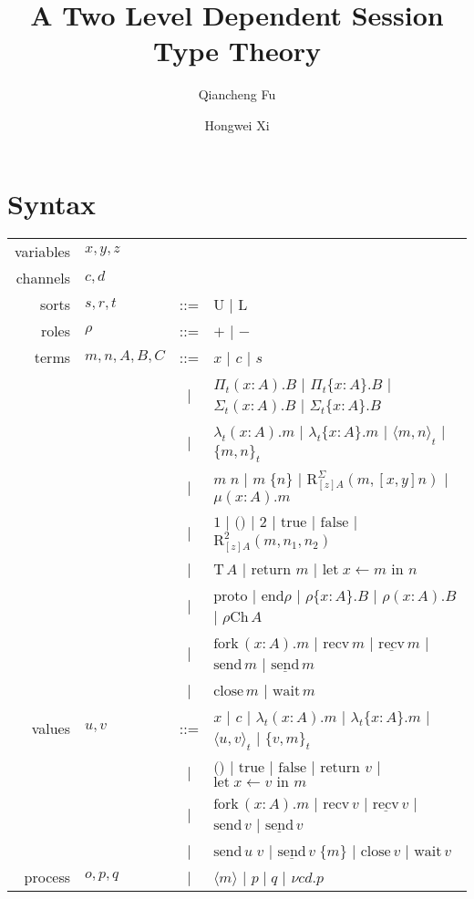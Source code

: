 \documentclass{article}
\title{A Two Level Dependent Session Type Theory}
\author[1]{Qiancheng Fu}
\author[1]{Hongwei Xi}
\affil[1]{Boston University}
\newcommand{\Un}{\text{U}}
\newcommand{\Ln}{\text{L}}
\newcommand{\PiR}[3]{\Pi_{#1}({#2}).{#3}}
\newcommand{\PiI}[3]{\Pi_{#1}\{{#2}\}.{#3}}
\newcommand{\lamR}[3]{\lambda_{#1}({#2}).{#3}}
\newcommand{\lamI}[3]{\lambda_{#1}\{{#2}\}.{#3}}
\newcommand{\appR}[2]{{#1}\;{#2}}
\newcommand{\appI}[2]{{#1}\;\{{#2}\}}
\newcommand{\SigR}[3]{\Sigma_{#1}({#2}).{#3}}
\newcommand{\SigI}[3]{\Sigma_{#1}\{{#2}\}.{#3}}
\newcommand{\pairR}[3]{\langle{{#1},{#2}}\rangle_{#3}}
\newcommand{\pairI}[3]{\{{#1},{#2}\}_{#3}}
\newcommand{\SigElim}[3]{\text{R}_{#1}^{\Sigma}({#2},{#3})}
\newcommand{\fix}[2]{\mu({#1}).{#2}}
\newcommand{\unit}{\text{1}}
\newcommand{\ii}{\text{()}}
\newcommand{\bool}{\text{2}}
\newcommand{\btrue}{\text{true}}
\newcommand{\bfalse}{\text{false}}
\newcommand{\boolElim}[4]{\text{R}_{#1}^{\bool}({#2},{#3},{#4})}
\newcommand{\T}[1]{\text{T}\,{#1}}
\newcommand{\return}[1]{\text{return }{#1}}
\newcommand{\letin}[3]{\text{let}\;{#1}\leftarrow{#2}\text{ in }{#3}}
\newcommand{\proto}{\text{proto}}
\newcommand{\protoEnd}[1]{\text{end}{#1}}
\newcommand{\actI}[3]{{#1}\{{#2}\}.{#3}}
\newcommand{\actR}[3]{{#1}({#2}).{#3}}
\newcommand{\Ch}[2]{{#1}\text{Ch}\,{#2}}
\newcommand{\fork}[2]{\text{fork}\,({#1}).{#2}}
\newcommand{\recvI}[1]{\underline{\text{recv}}\,{#1}}
\newcommand{\recvR}[1]{\text{recv}\,{#1}}
\newcommand{\sendI}[1]{\underline{\text{send}}\,{#1}}
\newcommand{\sendR}[1]{\text{send}\,{#1}}
\newcommand{\close}[1]{\text{close}\,{#1}}
\newcommand{\wait}[1]{\text{wait}\,{#1}}
\newcommand{\scope}[2]{\nu{#1}.{#2}}
\begin{document}
\maketitle

\section{Syntax}
\begin{center}
  \begin{tabular}{r l c l}
    variables & $x, y, z$   &     &               \\
    channels  & $c, d$      &     &               \\
    sorts     & $s, r, t$   & ::= & $\Un$ | $\Ln$ \\
    roles     & $\rho$      & ::= & $+$ | $-$ \\
    terms     & $m,n,A,B,C$ & ::= & $x$ | $c$ | $s$ \\
              &             & \;| & $\PiR{t}{x : A}{B}$ | $\PiI{t}{x : A}{B}$
                                    | $\SigR{t}{x : A}{B}$ | $\SigI{t}{x : A}{B}$ \\
              &             & \;| & $\lamR{t}{x : A}{m}$ | $\lamI{t}{x : A}{m}$
                                    | $\pairR{m}{n}{t}$ | $\pairI{m}{n}{t}$ \\
              &             & \;| & $\appR{m}{n}$ | $\appI{m}{n}$ | $\SigElim{[z]A}{m}{[x,y]n}$ | $\fix{x : A}{m}$ \\
              &             & \;| & $\unit$ | $\ii$ | $\bool$ | $\btrue$ | $\bfalse$
                                    | $\boolElim{[z]A}{m}{n_{1}}{n_{2}}$ \\
              &             & \;| & $\T{A}$ | $\return{m}$ | $\letin{x}{m}{n}$ \\
              &             & \;| & $\proto$ | $\protoEnd{\rho}$
                                    | $\actI{\rho}{x : A}{B}$ | $\actR{\rho}{x : A}{B}$ | $\Ch{\rho}{A}$ \\
              &             & \;| & $\fork{x : A}{m}$ | $\recvR{m}$ | $\recvI{m}$
                                    | $\sendR{m}$ | $\sendI{m}$ \\
              &             & \;| & $\close{m}$ | $\wait{m}$ \\
    values    & $u, v$      & ::= & $x$ | $c$ | $\lamR{t}{x : A}{m}$ | $\lamI{t}{x : A}{m}$
                                    | $\pairR{u}{v}{t}$ | $\pairI{v}{m}{t}$ \\
              &             & \;| & $\ii$ | $\btrue$ | $\bfalse$ | $\return{v}$ | $\letin{x}{v}{m}$ \\
              &             & \;| & $\fork{x : A}{m}$ | $\recvR{v}$ | $\recvI{v}$ | $\sendR{v}$ | $\sendI{v}$ \\
              &             & \;| & $\appR{\sendR{u}}{v}$ | $\appI{\sendI{v}}{m}$ | $\close{v}$ | $\wait{v}$ \\
    process   & $o, p, q$   & \;| & $\langle m \rangle$ | $p \mid q$ | $\scope{cd}{p}$
  \end{tabular}
\end{center}
\end{document}
